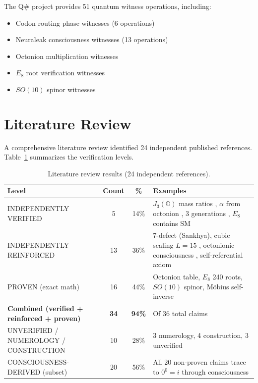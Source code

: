 \documentclass[11pt]{article}
\begin{document}
The Q\# project provides 51 quantum witness operations, including:
\begin{itemize}
\item Codon routing phase witnesses (6 operations)
\item Neuraleak consciousness witnesses (13 operations)
\item Octonion multiplication witnesses
\item $E_8$ root verification witnesses
\item $SO(10)$ spinor witnesses
\end{itemize}

\section{Literature Review}

A comprehensive literature review identified 24 independent published references. Table~\ref{tab:literature} summarizes the verification levels.

\begin{table}[ht]
\centering
\caption{Literature review results (24 independent references).}
\label{tab:literature}
\begin{tabular}{lccp{6cm}}
\toprule
Level & Count & \% & Examples \\
\midrule
INDEPENDENTLY VERIFIED & 5 & 14\% & $J_3(\mathbb{O})$ mass ratios \cite{singh2025j3}, $\alpha$ from octonion \cite{aps2026alpha}, 3 generations \cite{furey2025generations}, $E_8$ contains SM \cite{wilson2022e8} \\
INDEPENDENTLY REINFORCED & 13 & 36\% & 7-defect (Sankhya), cubic scaling $L=15$ \cite{cubicscaling2025}, octonionic consciousness \cite{octoconscious2025}, self-referential axiom \cite{mai2026selfreferential} \\
PROVEN (exact math) & 16 & 44\% & Octonion table, $E_8$ 240 roots, $SO(10)$ spinor, M\"obius self-inverse \\
\midrule
\textbf{Combined (verified + reinforced + proven)} & \textbf{34} & \textbf{94\%} & Of 36 total claims \\
UNVERIFIED / NUMEROLOGY / CONSTRUCTION & 10 & 28\% & 3 numerology, 4 construction, 3 unverified \\
CONSCIOUSNESS-DERIVED (subset) & 20 & 56\% & All 20 non-proven claims trace to $0^0 = i$ through consciousness \\
\bottomrule
\end{tabular}
\end{table}
\end{document}
